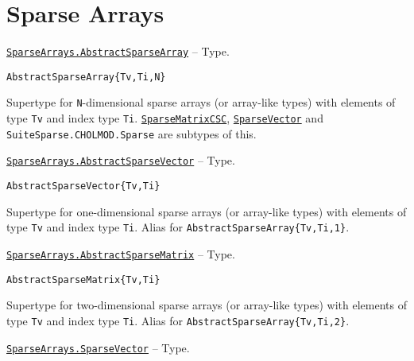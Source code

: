 \hypertarget{2402954669804328212}{}


\chapter{Sparse Arrays}


\hypertarget{428748181300158251}{} 
\hyperlink{428748181300158251}{\texttt{SparseArrays.AbstractSparseArray}}  -- {Type.}

\begin{adjustwidth}{2em}{0pt}


\begin{verbatim}
AbstractSparseArray{Tv,Ti,N}
\end{verbatim}

Supertype for \texttt{N}-dimensional sparse arrays (or array-like types) with elements of type \texttt{Tv} and index type \texttt{Ti}. \hyperlink{15099699527958384292}{\texttt{SparseMatrixCSC}}, \hyperlink{17594730109701296640}{\texttt{SparseVector}} and \texttt{SuiteSparse.CHOLMOD.Sparse} are subtypes of this.



\end{adjustwidth}
\hypertarget{7311510774978482969}{} 
\hyperlink{7311510774978482969}{\texttt{SparseArrays.AbstractSparseVector}}  -- {Type.}

\begin{adjustwidth}{2em}{0pt}


\begin{verbatim}
AbstractSparseVector{Tv,Ti}
\end{verbatim}

Supertype for one-dimensional sparse arrays (or array-like types) with elements of type \texttt{Tv} and index type \texttt{Ti}. Alias for \texttt{AbstractSparseArray\{Tv,Ti,1\}}.



\end{adjustwidth}
\hypertarget{7507379576530105001}{} 
\hyperlink{7507379576530105001}{\texttt{SparseArrays.AbstractSparseMatrix}}  -- {Type.}

\begin{adjustwidth}{2em}{0pt}


\begin{verbatim}
AbstractSparseMatrix{Tv,Ti}
\end{verbatim}

Supertype for two-dimensional sparse arrays (or array-like types) with elements of type \texttt{Tv} and index type \texttt{Ti}. Alias for \texttt{AbstractSparseArray\{Tv,Ti,2\}}.



\end{adjustwidth}
\hypertarget{17594730109701296640}{} 
\hyperlink{17594730109701296640}{\texttt{SparseArrays.SparseVector}}  -- {Type.}

